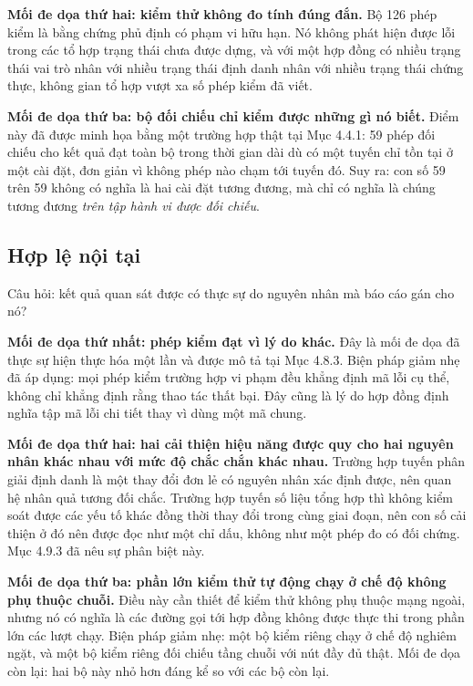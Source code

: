 \noindent \textbf{Mối đe dọa thứ hai: kiểm thử không đo tính đúng đắn.} Bộ 126 phép kiểm là bằng chứng phủ định có phạm vi hữu hạn. Nó không phát hiện được lỗi trong các tổ hợp trạng thái chưa được dựng, và với một hợp đồng có nhiều trạng thái vai trò nhân với nhiều trạng thái định danh nhân với nhiều trạng thái chứng thực, không gian tổ hợp vượt xa số phép kiểm đã viết.

\noindent \textbf{Mối đe dọa thứ ba: bộ đối chiếu chỉ kiểm được những gì nó biết.} Điểm này đã được minh họa bằng một trường hợp thật tại Mục 4.4.1: 59 phép đối chiếu cho kết quả đạt toàn bộ trong thời gian dài dù có một tuyến chỉ tồn tại ở một cài đặt, đơn giản vì không phép nào chạm tới tuyến đó. Suy ra: con số 59 trên 59 không có nghĩa là hai cài đặt tương đương, mà chỉ có nghĩa là chúng tương đương \emph{trên tập hành vi được đối chiếu}.

\subsection{Hợp lệ nội tại}

Câu hỏi: kết quả quan sát được có thực sự do nguyên nhân mà báo cáo gán cho nó?

\noindent \textbf{Mối đe dọa thứ nhất: phép kiểm đạt vì lý do khác.} Đây là mối đe dọa đã thực sự hiện thực hóa một lần và được mô tả tại Mục 4.8.3. Biện pháp giảm nhẹ đã áp dụng: mọi phép kiểm trường hợp vi phạm đều khẳng định mã lỗi cụ thể, không chỉ khẳng định rằng thao tác thất bại. Đây cũng là lý do hợp đồng định nghĩa tập mã lỗi chi tiết thay vì dùng một mã chung.

\noindent \textbf{Mối đe dọa thứ hai: hai cải thiện hiệu năng được quy cho hai nguyên nhân khác nhau với mức độ chắc chắn khác nhau.} Trường hợp tuyến phân giải định danh là một thay đổi đơn lẻ có nguyên nhân xác định được, nên quan hệ nhân quả tương đối chắc. Trường hợp tuyến số liệu tổng hợp thì không kiểm soát được các yếu tố khác đồng thời thay đổi trong cùng giai đoạn, nên con số cải thiện ở đó nên được đọc như một chỉ dấu, không như một phép đo có đối chứng. Mục 4.9.3 đã nêu sự phân biệt này.

\noindent \textbf{Mối đe dọa thứ ba: phần lớn kiểm thử tự động chạy ở chế độ không phụ thuộc chuỗi.} Điều này cần thiết để kiểm thử không phụ thuộc mạng ngoài, nhưng nó có nghĩa là các đường gọi tới hợp đồng không được thực thi trong phần lớn các lượt chạy. Biện pháp giảm nhẹ: một bộ kiểm riêng chạy ở chế độ nghiêm ngặt, và một bộ kiểm riêng đối chiếu tầng chuỗi với nút đầy đủ thật. Mối đe dọa còn lại: hai bộ này nhỏ hơn đáng kể so với các bộ còn lại.

